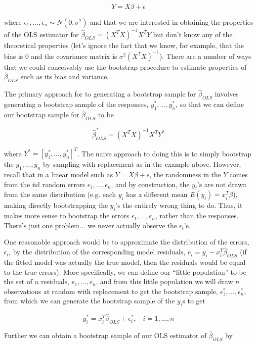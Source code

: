 $$Y = X \beta + \epsilon$$

where $\epsilon_1, ..., \epsilon_n \sim N(0, \sigma^2)$ and that we are interested in obtaining the properties of the OLS estimator for $\hat{\beta}_{OLS} = (X^TX)^{-1}X^TY$ but don't know any of the theoretical properties (let's ignore the fact that we know, for example, that the bias is $0$ and the covariance matrix is $\sigma^2(X^TX)^{-1}$). There are a number of ways that we could conceivably use the bootstrap procedure to estimate properties of $\hat{\beta}_{OLS}$ such as its bias and variance.


The primary approach for to generating a bootstrap sample for $\hat{\beta}_{OLS}$ involves generating a bootstrap sample of the responses, $y_1^*, ..., y_n^*$, so that we can define our bootstrap sample for $\hat{\beta}_{OLS}$ to be

$$\hat{\beta}_{OLS}^* = (X^TX)^{-1}X^TY^*$$


where $Y^* = [y_1^*, ..., y_n^*]^T$. The naive approach to doing this is to simply bootstrap the $y_1, ..., y_n$ by sampling with replacement as in the example above. However, recall that in a linear model such as $Y = X \beta  + \epsilon$, the randomness in the $Y$ comes from the iid random errors $\epsilon_1, ..., \epsilon_n$, and by construction, the $y_i$'s are not drawn from the same distribution (e.g. each $y_i$ has a different mean $E(y_i) = x_i^T\beta$), making directly bootstrapping the $y_i$'s the entirely wrong thing to do. Thus, it makes more sense to bootstrap the errors $\epsilon_1, ..., \epsilon_n$, rather than the responses. There's just one problem... we never actually observe the $\epsilon_i$'s.


One reasonable approach would be to approximate the distribution of the errors, $\epsilon_i$, by the distribution of the corresponding model residuals, $e_i = y_i - x_i^T \hat{\beta}_{OLS}$ (if the fitted model was actually the true model, then the residuals would be equal to the true errors). More specifically, we can define our ``little population'' to be the set of $n$ residuals, $e_1, ..., e_n$, and from this little population we will draw $n$ observations at random with replacement to get the bootstrap sample, $\epsilon_1^*, ..., \epsilon_n^*$, from which we can generate the bootstrap sample of the $y_i$s to get 

$$y_i^* = x_i^T\hat{\beta}_{OLS} + \epsilon_i^*, ~~~~ i = 1, ..., n$$ 

Further we can obtain a bootstrap sample of our OLS estimator of $\hat{\beta}_{OLS}$ by

